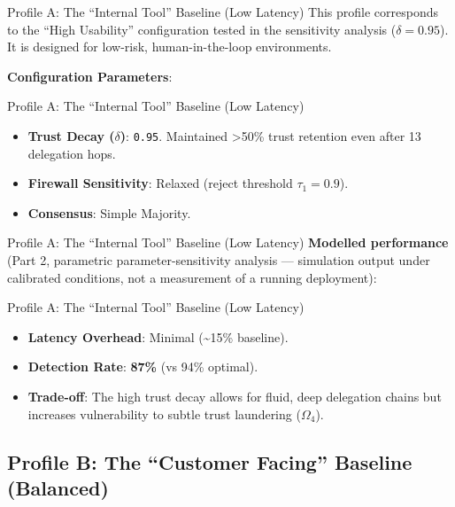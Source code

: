 \documentclass[
  ignorenonframetext,
]{beamer}
\providecommand{\tightlist}{%
  \setlength{\itemsep}{0pt}\setlength{\parskip}{0pt}}
\begin{document}
\begin{frame}{Profile A: The ``Internal Tool''
Baseline (Low Latency)}
This profile corresponds to the ``High Usability'' configuration tested
in the sensitivity analysis (\(\delta=0.95\)). It is designed for
low-risk, human-in-the-loop environments.

\textbf{Configuration Parameters}:

\end{frame}

\begin{frame}{Profile A: The ``Internal Tool''
Baseline (Low Latency)}
\begin{itemize}
\tightlist
\item
  \textbf{Trust Decay (\(\delta\))}: \texttt{0.95}. Maintained
  \textgreater50\% trust retention even after 13 delegation hops.
\item
  \textbf{Firewall Sensitivity}: Relaxed (reject threshold
  \(\tau_1 =0.9\)).
\item
  \textbf{Consensus}: Simple Majority.
\end{itemize}

\end{frame}

\begin{frame}{Profile A: The ``Internal Tool''
Baseline (Low Latency)}
\textbf{Modelled performance} (Part 2, parametric parameter-sensitivity
analysis --- simulation output under calibrated conditions, not a
measurement of a running deployment):

\end{frame}

\begin{frame}{Profile A: The ``Internal Tool''
Baseline (Low Latency)}
\begin{itemize}
\tightlist
\item
  \textbf{Latency Overhead}: Minimal (\textasciitilde15\% baseline).
\item
  \textbf{Detection Rate}: \textbf{87\%} (vs 94\% optimal).
\item
  \textbf{Trade-off}: The high trust decay allows for fluid, deep
  delegation chains but increases vulnerability to subtle trust
  laundering (\(\Omega_4\)).
\end{itemize}
\end{frame}

\subsection{Profile B: The ``Customer Facing'' Baseline
(Balanced)}\label{profile-b-the-customer-facing-baseline-balanced}
\end{document}
